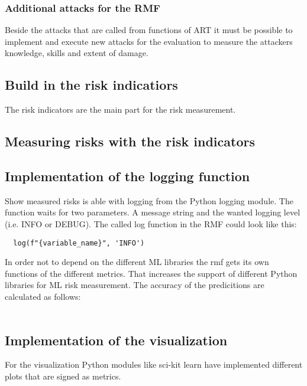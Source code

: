 \subsubsection*{Additional attacks for the RMF}

Beside the attacks that are called from functions of ART it must be possible to implement and execute new attacks for the evaluation to measure the attackers knowledge, skills and extent
of damage.

\subsection{Build in the risk indicatiors}

The risk indicators are the main part for the risk measurement.

\subsection{Measuring risks with the risk indicators}

\subsection{Implementation of the logging function}

Show measured risks is able with logging from the Python logging module. The function waits for two parameters. A message string and the wanted logging level (i.e. INFO or DEBUG). The called log function in the RMF could look like this:
\begin{lstlisting}
  log(f"{variable_name}", 'INFO')
\end{lstlisting}

In order not to depend on the different ML libraries the rmf gets its own functions of the different metrics. That increases the support of different Python libraries for ML risk
measurement. The accuracy of the predicitions are calculated as follows: \\ \\

\subsection{Implementation of the visualization}

For the visualization Python modules like sci-kit learn have implemented different plots that are signed as metrics.
